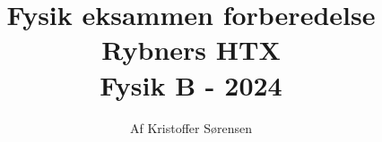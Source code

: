 \title{
    Fysik eksammen forberedelse \\ 
    \large{Rybners HTX} \\
    \small{Fysik B - 2024}
}
\author{Af Kristoffer Sørensen} %
\thispagestyle{empty}
\maketitle
\newpage
\tableofcontents
\newpage
